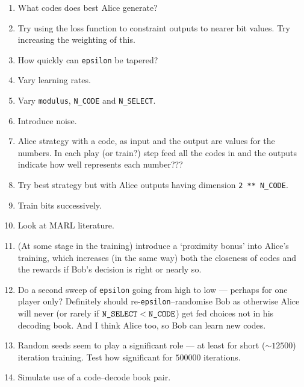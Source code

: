 \documentclass[12pt]{article}
\begin{document}
\begin{enumerate}
	\item What codes does best Alice generate?
	
	\item Try using the loss function to constraint outputs to nearer bit values.  Try increasing the weighting of this.
	
	\item How quickly can \verb|epsilon| be tapered? 
	
	\item Vary learning rates.
	
	\item Vary \verb|modulus|, \verb|N_CODE| and \verb|N_SELECT|.
	
	\item Introduce noise.
	
	\item Alice strategy with a code, as input and the output are values for the numbers.  In each play (or train?) step feed all the codes in and the outputs indicate how well represents each number???
	
	\item Try best strategy but with Alice outputs having dimension \verb|2 ** N_CODE|.
	
	\item Train bits successively. 
	
	\item Look at MARL literature.
	
	\item (At some stage in the training) introduce a `proximity bonus' into Alice's training, which increases (in the same way) both the closeness of codes and the rewards if Bob's decision is right or nearly so.
	
	\item Do a second sweep of \verb|epsilon| going from high to low --- perhaps for one player only?  Definitely should re-\verb|epsilon|--randomise Bob as otherwise Alice will never (or rarely if $\verb|N_SELECT| < \verb|N_CODE|$) get fed choices not in his decoding book.  And I think Alice too, so Bob can learn new codes.
	
	\item Random seeds seem to play a significant role --- at least for short ($\sim \num{12500}$) iteration training.  Test how significant for $\num{500000}$ iterations.
	
	\item Simulate use of a code--decode book pair.
	
\end{enumerate}
\end{document}
